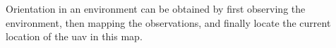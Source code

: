 Orientation in an environment can be obtained by first observing the environment, then mapping the observations, and finally locate the current location of the \acs{uav} in this map.